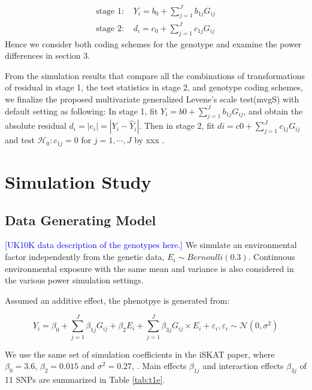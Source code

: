 \documentclass{article}
\begin{document}
\begin{enumerate}[(1)]
    \begin{equation}
    \begin{split}
    \text{stage 1: } & Y_i= b_0+\sum_{j=1}^Jb_{1j}G_{ij}\\
    \text{stage 2: } & d_i = c_0+\sum_{j=1}^J c_{1j} G_{ij}
       \end{split}
    \end{equation} 
    Hence we consider both coding schemes for the genotype and examine the power differences in section 3.
\end{enumerate}


From the simulation results that compare all the combinations of transformations of residual in stage 1, the test statistics in stage 2, and genotype coding schemes, we finalize the proposed multivariate generalized Levene's scale test(mvgS) with default setting as following:
In stage 1, fit $Y_i = b0+\sum_{j=1}^J b_{1j}G_{ij}$, and obtain the absolute residual $d_i=|e_i|=|Y_{i}-\widehat{Y}_{i}|$. Then in stage 2, fit
$di=c0+\sum_{j=1}^J c_{1j}G_{ij}$ and test $\mathcal{H}_0: c_{1j}=0$ for $j=1,\cdots,J$ by xxx .


\section{Simulation Study}

\subsection{Data Generating Model}
\textcolor{blue}{[UK10K data description of the genotypes here.]} We simulate an environmental factor independently from the genetic data,  $E_i\sim Bernoulli(0.3)$. Continuous environmental exposure with the same mean and variance is also considered in the various power simulation settings.

Assumed an additive effect, the phenotpye is generated from:

\begin{equation}
    Y_i=\beta_0+\sum_{j=1}^J\beta_{1j}G_{ij}+\beta_{2}E_i+\sum_{j=1}^J\beta_{3j}G_{ij}\times E_i+\varepsilon_i, \varepsilon_i\sim \mathcal{N}(0,\sigma^2)
    \label{eq:gendat}
\end{equation}

We use the same set of simulation coefficients in the iSKAT paper, where $\beta_0=3.6$, $\beta_2=0.015$ and $\sigma^2=0.27$, . Main effects $\beta_{1j}$ and interaction effects $\beta_{3j}$ of 11 SNPs are summarized in Table \ref{tab:t1e}.
\end{document}
